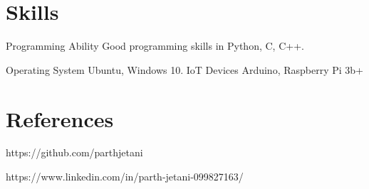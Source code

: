 \documentclass[]{cv-style}          %
\begin{document}
\section{Skills}
  \vspace{-0.2cm}

\begin{entrylist}

\entry
  {}
  {Programming Ability }
  {}
  {\jobtitle{}Good programming skills in Python, C, C++. }
 
 \entry
  {}
  {Operating System }
  {}
  {\jobtitle{}Ubuntu, Windows 10. }
  \entry
  {}
  {IoT Devices}
  {}
  {\jobtitle{}Arduino, Raspberry Pi 3b+ }

 
  
  

\end{entrylist}



\section{References}
  \vspace{-0.2cm}
\begin{entrylist}

\entry
  {}
  {https://github.com/parthjetani }
 


 

\end{entrylist}
\begin{entrylist}

\entry{}
  {https://www.linkedin.com/in/parth-jetani-099827163/}
 




\end{entrylist}
\end{document}
